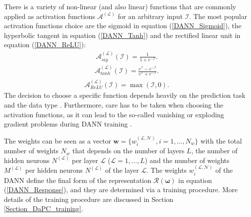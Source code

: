 \documentclass[a4paper,fleqn]{article}
\newcommand{\rw}[1]{\textcolor{blue}{#1}}
\newcommand{\del}[1]{\textcolor{red}{\sout{#1}}}
\renewcommand{\del}[1]{}
\renewcommand{\rw}[1]{#1}
\begin{document}
There is a variety of non-linear (and also linear) functions that \del{can be} \rw{are commonly} applied as activation functions $\mathcal{A}^{(\mathcal{L})}$ for an arbitrary input $\mathcal{I}$. The most popular activation functions choice are \rw{the} sigmoid in equation (\ref{DANN_Sigmoid}), \rw{the} hyperbolic tangent in equation (\ref{DANN_Tanh}) and \rw{the} rectified linear unit in equation (\ref{DANN_ReLU}):
\begin{eqnarray}
\label{DANN_Sigmoid}
\mathcal{A}_{sig}^{(\mathcal{L})}(\mathcal{I}) =  \frac{1}{1+e^{-\mathcal{I}}}.
\end{eqnarray}
%
\begin{eqnarray}
\label{DANN_Tanh}
\mathcal{A}_{tanh}^{(\mathcal{L})}(\mathcal{I})  =  \frac{e^{\mathcal{I}} - e^{-\mathcal{I}}}{e^{\mathcal{I}} + e^{-\mathcal{I}}}.
\end{eqnarray}
%
\begin{eqnarray}
\label{DANN_ReLU}
\mathcal{A}_{ReLU}^{(\mathcal{L})}(\mathcal{I})  =  \max(\mathcal{I},0).
\end{eqnarray}
 The decision to choose a specific function depends heavily on the prediction task and the data type \cite{sharma2017activation}. Furthermore, care has to be taken when choosing the activation functions, as it can lead to \rw{the so-called} vanishing or exploding gradient problems during DANN training \cite{Aggarwal2018neuralnetworks}.

The weights \del{could  be seeing} \rw{can be seen} as a vector
$\bm{w}=\big\{w^{(\mathcal{L},\mathcal{N})}_{i},i=1,\ldots,N_w \big\}$ with the total number of weights $N_w$ that depends on the number of layers $L$, the number of hidden neurons $N^{(\mathcal{L})}$ per layer $\mathcal{L}$ ($\mathcal{L}=1,\ldots,L$) and the number of weights $M^{(\mathcal{L})}$ per hidden neurons $N^{(\mathcal{L})}$ of the layer $\mathcal{L}$. The weights $w^{(\mathcal{L},\mathcal{N})}_{i}$ of the DANN define the final form of the representation $\mathcal{R}(\bm{\omega})$ in equation (\ref{DANN_Response}), and they are determined via a training procedure. More details of the training procedure are discussed in Section \ref{Section_DaPC_training}.
\end{document}
